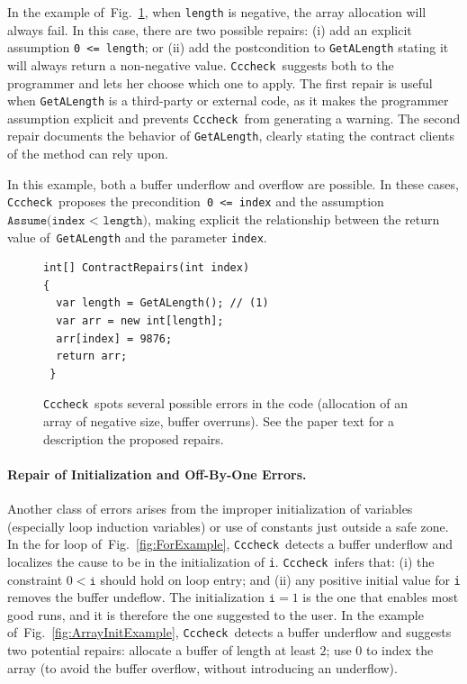 \documentclass[10pt]{sigplanconf}
\newcommand{\labelFig}[1]{\label{fig:#1}}
\newcommand{\refFig}[1]{Fig.~\ref{fig:#1}}
\newcommand{\code}[1]{\texttt{#1}}
\newcommand{\Clousot}{\code{Cccheck}}
\begin{document}
In the example of~\refFig{AssumeExample}, when \code{length} is
negative, the array allocation will always fail.  In this case, there
are two possible repairs: (i) add an explicit assumption \code{0 <=
length}; or (ii) add the postcondition to \code{GetALength} stating it
will always return a non-negative value.  \Clousot\ suggests both to
the programmer and lets her choose which one to apply.  The first
repair is useful when \code{GetALength} is a third-party or external
code, as it makes the programmer assumption explicit and prevents
\Clousot\ from generating a warning. The second repair documents 
the behavior of \code{GetALength}, clearly stating the contract
clients of the method can rely upon.

In this example, both a buffer underflow and overflow are possible.
In these cases, \Clousot\ proposes the precondition~\code{0 <= index}
and the assumption
\(
\code{Assume}\allowbreak \code{(index}\allowbreak \code{ < length)}
\),
making explicit
the relationship between the return value of~\code{GetALength} and the
parameter \code{index}.


\begin{figure}
\begin{lstlisting}
int[] ContractRepairs(int index)
{
  var length = GetALength(); // (1)
  var arr = new int[length]; 
  arr[index] = 9876;
  return arr;
 }
\end{lstlisting}

\caption{\Clousot\ spots several possible errors in the code (allocation of an array of negative size, buffer overruns).  
See the paper text for a description the proposed repairs.}
\labelFig{AssumeExample}
\end{figure}




\paragraph{Repair of Initialization and Off-By-One Errors.} 
Another class of errors arises from the improper initialization of
variables (especially loop induction variables) or use of constants
just outside a safe zone.  In the for loop of~\refFig{ForExample},
\Clousot\ detects a buffer underflow and localizes the cause to be in
the initialization of \code{i}.  
\Clousot\ infers that: (i) the constraint $0 < \code{i}$ should hold on  loop entry; and (ii)  any positive initial value for \code{i} removes the buffer undeflow.
The initialization $\code{i} = 1$ is the one that enables most good runs, and it is therefore the one suggested to the user.
In the example of~\refFig{ArrayInitExample},
\Clousot\ detects a buffer underflow and suggests two potential
repairs: allocate a buffer of length at least $2$; use $0$ to index
the array (to avoid the buffer overflow, without introducing an
underflow).
\end{document}
